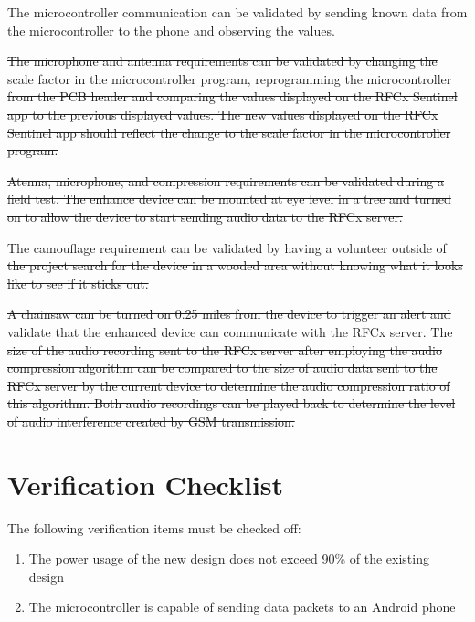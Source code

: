 \documentclass{article}
\numberwithin{figure}{section}
\numberwithin{equation}{section}
\begin{document}
{The microcontroller communication can be validated by sending known data from the microcontroller to the phone and observing the values.

\bigskip

\sout{The microphone and antenna requirements can be validated by changing the scale factor in the microcontroller program, reprogramming the microcontroller from the PCB header and comparing the values displayed on the RFCx Sentinel app to the previous displayed values. The new values displayed on the RFCx Sentinel app should reflect the change to the scale factor in the microcontroller program.}

\bigskip

\sout{Atenna, microphone, and compression requirements can be validated during a field test. The enhance device can be mounted at eye level in a tree and turned on to allow the device to start sending audio data to the RFCx server.}

\bigskip

\sout{The camouflage requirement can be validated by having a volunteer outside of the project search for the device in a wooded area without knowing what it looks like to see if it sticks out.}

\bigskip

\sout{A chainsaw can be turned on 0.25 miles from the device to trigger an alert and validate that the enhanced device can communicate with the RFCx server. The size of the audio recording sent to the RFCx server after employing the audio compression algorithm can be compared to the size of audio data sent to the RFCx server by the current device to determine the audio compression ratio of this algorithm. Both audio recordings can be played back to determine the level of audio interference created by GSM transmission.}

\section{Verification Checklist} \label{sect:verification_chk}
The following verification items must be checked off:

\begin{enumerate}[align=left,leftmargin=*, labelindent= 0em, label=\textbf{\CheckBox{} Item \thesubsubsection.\arabic*.}, itemindent=0em]
    \item \label{ver1}The power usage of the new design does not exceed 90\% of the existing design
    \item \label{ver2}The microcontroller is capable of sending data packets to an Android phone
\end{enumerate}

}
\end{document}

